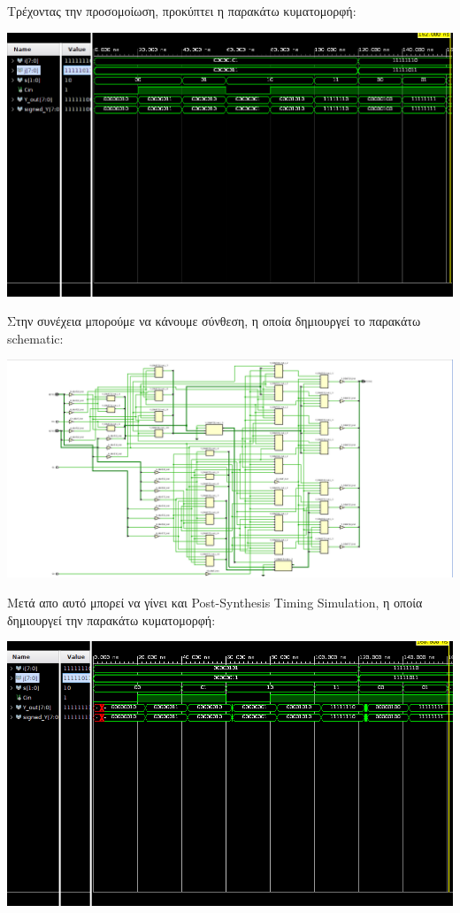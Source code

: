\documentclass[11pt, a4paper]{report}
\begin{document}
Τρέχοντας την προσομοίωση, προκύπτει η παρακάτω κυματομορφή:
\begin{center}
	\includegraphics[width=\textwidth]{./images/alu-1/Joe_Behavioral_Sim_Fixed.png}
\end{center}

Στην συνέχεια μπορούμε να κάνουμε σύνθεση, η οποία δημιουργεί το παρακάτω schematic:
\begin{center}
  \includegraphics[width=\textwidth]{./images/alu-1/Joe_Synth_Schematic.png}
\end{center}

Μετά απο αυτό μπορεί να γίνει και Post-Synthesis Timing Simulation, η οποία δημιουργεί την παρακάτω κυματομορφή:
\begin{center}
  \includegraphics[width=\textwidth]{./images/alu-1/Joe_PST_Fixed.png}
\end{center}
\end{document}
